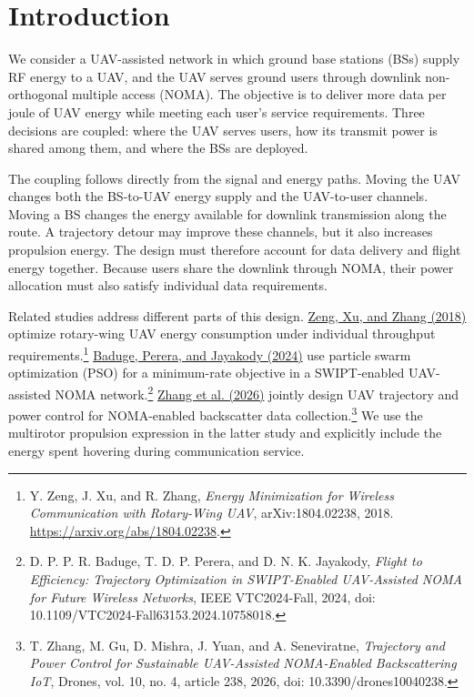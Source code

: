 \documentclass[conference]{IEEEtran}
\begin{document}
\section{Introduction}
\label{sec:introduction}
We consider a UAV-assisted network in which ground base stations (BSs) supply RF energy to a UAV, and the UAV serves ground users through downlink non-orthogonal multiple access (NOMA). The objective is to deliver more data per joule of UAV energy while meeting each user's service requirements. Three decisions are coupled: where the UAV serves users, how its transmit power is shared among them, and where the BSs are deployed.

The coupling follows directly from the signal and energy paths. Moving the UAV changes both the BS-to-UAV energy supply and the UAV-to-user channels. Moving a BS changes the energy available for downlink transmission along the route. A trajectory detour may improve these channels, but it also increases propulsion energy. The design must therefore account for data delivery and flight energy together. Because users share the downlink through NOMA, their power allocation must also satisfy individual data requirements.

Related studies address different parts of this design. \href{https://arxiv.org/abs/1804.02238}{Zeng, Xu, and Zhang (2018)} optimize rotary-wing UAV energy consumption under individual throughput requirements.\footnote{Y. Zeng, J. Xu, and R. Zhang, \emph{Energy Minimization for Wireless Communication with Rotary-Wing UAV}, arXiv:1804.02238, 2018. \url{https://arxiv.org/abs/1804.02238}.} \href{https://doi.org/10.1109/VTC2024-Fall63153.2024.10758018}{Baduge, Perera, and Jayakody (2024)} use particle swarm optimization (PSO) for a minimum-rate objective in a SWIPT-enabled UAV-assisted NOMA network.\footnote{D. P. P. R. Baduge, T. D. P. Perera, and D. N. K. Jayakody, \emph{Flight to Efficiency: Trajectory Optimization in SWIPT-Enabled UAV-Assisted NOMA for Future Wireless Networks}, IEEE VTC2024-Fall, 2024, doi: 10.1109/VTC2024-Fall63153.2024.10758018.} \href{https://doi.org/10.3390/drones10040238}{Zhang et al. (2026)} jointly design UAV trajectory and power control for NOMA-enabled backscatter data collection.\footnote{T. Zhang, M. Gu, D. Mishra, J. Yuan, and A. Seneviratne, \emph{Trajectory and Power Control for Sustainable UAV-Assisted NOMA-Enabled Backscattering IoT}, Drones, vol. 10, no. 4, article 238, 2026, doi: 10.3390/drones10040238.} We use the multirotor propulsion expression in the latter study and explicitly include the energy spent hovering during communication service.
\end{document}
